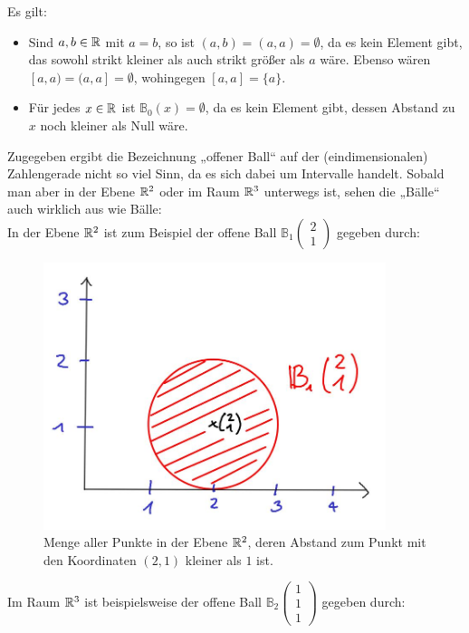 \begin{bem}
Es gilt:
\begin{itemize}
 \item Sind $a,b\in {\mathbb R}$ mit $a=b$, so ist $(a,b)=(a,a)=\emptyset$, da es kein Element gibt, das sowohl strikt kleiner als auch strikt größer als $a$ wäre. Ebenso wären $[a,a)=(a,a]=\emptyset$, wohingegen $[a,a]=\{a\}$.
 \item Für jedes $x\in {\mathbb R}$ ist $\mathbb{B}_0(x)=\emptyset$, da es kein Element gibt, dessen Abstand zu $x$ noch kleiner als Null wäre.
\end{itemize}
\end{bem}



\begin{bem}
 Zugegeben ergibt die Bezeichnung „offener Ball“ auf der (eindimensionalen) Zahlengerade nicht so viel Sinn, da es sich dabei um Intervalle handelt. Sobald man aber in der Ebene ${\mathbb R}^2$ oder im Raum ${\mathbb R}^3$ unterwegs ist, sehen die „Bälle“ auch wirklich aus wie Bälle: \\[0.5em]
 In der Ebene ${\mathbb R}^2$ ist zum Beispiel der offene Ball $\mathbb{B}_{1}\begin{pmatrix} 2 \\ 1\end{pmatrix}$ gegeben durch: \\
    \begin{figure}[H]
\begin{center}
\includegraphics[width=10cm]{./_img/2Dball.jpeg}
\end{center}
\centering \caption{Menge aller Punkte in der Ebene ${\mathbb R}^2$, deren Abstand zum Punkt mit den Koordinaten $(2,1)$ kleiner als $1$ ist.}
\end{figure}
Im Raum ${\mathbb R}^3$ ist beispielsweise der offene Ball $\mathbb{B}_{2}\begin{pmatrix} 1\\ 1 \\ 1\end{pmatrix}$ gegeben durch: \\

\end{bem}
